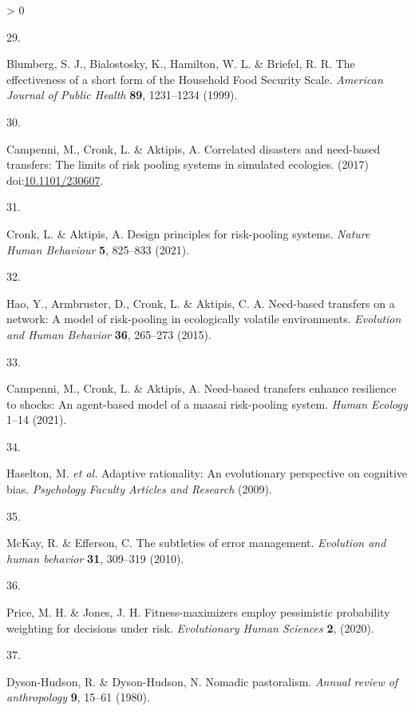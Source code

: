 \documentclass[
]{article}
\newlength{\cslhangindent}
\newlength{\csllabelwidth}
\newenvironment{CSLReferences}[2] %
 {%
  \setlength{\parindent}{0pt}
  \ifodd #1 \everypar{\setlength{\hangindent}{\cslhangindent}}\ignorespaces\fi
  \ifnum #2 > 0
  \setlength{\parskip}{#2\baselineskip}
  \fi
 }%
 {}
\newcommand{\CSLLeftMargin}[1]{\parbox[t]{\csllabelwidth}{#1}}
\newcommand{\CSLRightInline}[1]{\parbox[t]{\linewidth - \csllabelwidth}{#1}\break}
\begin{document}
\begin{CSLReferences}{0}{0}
\leavevmode\hypertarget{ref-blumbergEffectivenessShortForm1999}{}%
\CSLLeftMargin{29. }
\CSLRightInline{Blumberg, S. J., Bialostosky, K., Hamilton, W. L. \& Briefel, R. R. The effectiveness of a short form of the {Household Food Security Scale}. \emph{American Journal of Public Health} \textbf{89}, 1231--1234 (1999).}

\leavevmode\hypertarget{ref-campenniCorrelatedDisastersNeedbased2017}{}%
\CSLLeftMargin{30. }
\CSLRightInline{Campenni, M., Cronk, L. \& Aktipis, A. Correlated disasters and need-based transfers: {The} limits of risk pooling systems in simulated ecologies. (2017) doi:\href{https://doi.org/10.1101/230607}{10.1101/230607}.}

\leavevmode\hypertarget{ref-cronk2021design}{}%
\CSLLeftMargin{31. }
\CSLRightInline{Cronk, L. \& Aktipis, A. Design principles for risk-pooling systems. \emph{Nature Human Behaviour} \textbf{5}, 825--833 (2021).}

\leavevmode\hypertarget{ref-haoNeedbasedTransfersNetwork2015}{}%
\CSLLeftMargin{32. }
\CSLRightInline{Hao, Y., Armbruster, D., Cronk, L. \& Aktipis, C. A. Need-based transfers on a network: A model of risk-pooling in ecologically volatile environments. \emph{Evolution and Human Behavior} \textbf{36}, 265--273 (2015).}

\leavevmode\hypertarget{ref-campenni2021need}{}%
\CSLLeftMargin{33. }
\CSLRightInline{Campenni, M., Cronk, L. \& Aktipis, A. Need-based transfers enhance resilience to shocks: An agent-based model of a maasai risk-pooling system. \emph{Human Ecology} 1--14 (2021).}

\leavevmode\hypertarget{ref-haseltonAdaptiveRationalityEvolutionary2009a}{}%
\CSLLeftMargin{34. }
\CSLRightInline{Haselton, M. \emph{et al.} Adaptive rationality: {An} evolutionary perspective on cognitive bias. \emph{Psychology Faculty Articles and Research} (2009).}

\leavevmode\hypertarget{ref-mckay2010subtleties}{}%
\CSLLeftMargin{35. }
\CSLRightInline{McKay, R. \& Efferson, C. The subtleties of error management. \emph{Evolution and human behavior} \textbf{31}, 309--319 (2010).}

\leavevmode\hypertarget{ref-priceFitnessmaximizersEmployPessimistic2020}{}%
\CSLLeftMargin{36. }
\CSLRightInline{Price, M. H. \& Jones, J. H. Fitness-maximizers employ pessimistic probability weighting for decisions under risk. \emph{Evolutionary Human Sciences} \textbf{2}, (2020).}

\leavevmode\hypertarget{ref-dyson-hudsonNomadicPastoralism1980}{}%
\CSLLeftMargin{37. }
\CSLRightInline{Dyson-Hudson, R. \& Dyson-Hudson, N. Nomadic pastoralism. \emph{Annual review of anthropology} \textbf{9}, 15--61 (1980).}


\end{CSLReferences}
\end{document}

